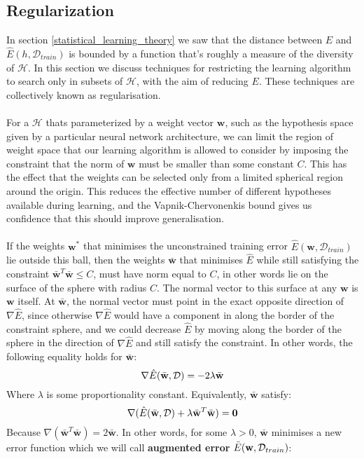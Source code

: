 \subsection{Regularization}
\label{regularisation}
In section \ref{statistical_learning_theory} we saw that the distance between $E$ and $\hat{E}(h, \mathcal{D}_{train})$ is bounded by a function that's roughly a measure of the diversity of $\mathcal{H}$. In this section we discuss techniques for restricting the learning algorithm to search only in subsets of $\mathcal{H}$, with the aim of reducing $E$. These techniques are collectively known as regularisation.
\\\\
For a $\mathcal{H}$ thats parameterized by a weight vector $\mathbf{w}$, such as the hypothesis space given by a particular neural network architecture, we can limit the region of weight space that our learning algorithm is allowed to consider by imposing the constraint that the norm of $\mathbf{w}$ must be smaller than some constant $C$. This has the effect that the weights can be selected only from a limited spherical region around the origin. This reduces the effective number of different hypotheses available during learning, and the Vapnik-Chervonenkis bound gives us confidence that this should improve generalisation.
\\\\
If the weights $\mathbf{w}^*$ that minimises the unconstrained training error $\hat{E}(\mathbf{w}, \mathcal{D}_{train})$ lie outside this ball, then the weights $\bar{\mathbf{w}}$ that minimises $\hat{E}$ while still satisfying the constraint $\bar{\mathbf{w}}^T\bar{\mathbf{w}} \leq C$, must have norm equal to $C$, in other words lie on the surface of the sphere with radius $C$. The normal vector to this surface at any $\mathbf{w}$ is $\mathbf{w}$ itself. At $\bar{\mathbf{w}}$, the normal vector must point in the exact opposite direction of $\nabla \hat{E}$, since otherwise $\nabla \hat{E}$ would have a component in along the border of the constraint sphere, and we could decrease $\hat{E}$ by moving along the border of the sphere in the direction of $\nabla \hat{E}$ and still satisfy the constraint. In other words, the following equality holds for $\bar{\mathbf{w}}$:
$$
\nabla \hat{E}(\bar{\mathbf{w}}, \mathcal{D}) = -2\lambda\bar{\mathbf{w}}
$$
Where $\lambda$ is some proportionality constant. Equivalently, $\bar{\mathbf{w}}$ satisfy:
$$
\nabla (\hat{E}(\bar{\mathbf{w}}, \mathcal{D}) + \lambda\bar{\mathbf{w}}^T\bar{\mathbf{w}}) = \mathbf{0}
$$
Because $\nabla(\bar{\mathbf{w}}^T\bar{\mathbf{w}}) = 2\bar{\mathbf{w}}$. In other words, for some $\lambda > 0$, $\bar{\mathbf{w}}$ minimises a new error function which we will call \textbf{augmented error} $\bar{E}(\mathbf{w}, \mathcal{D}_{train})$:
